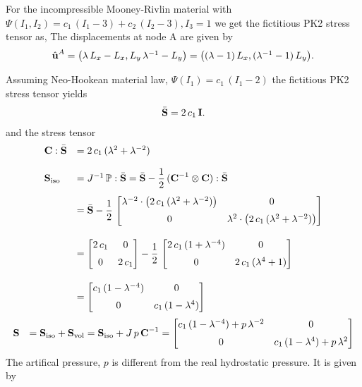 For the incompressible Mooney-Rivlin material with $\Psi(I_1,I_2) = c_1\,(I_1-3) + c_2\,(I_2 - 3), I_3 = 1$ we get the fictitious PK2 stress tensor as,
The displacements at node A are given by
\begin{equation*}
  \begin{array}{lll}
    \hat{\textbf{u}}^A = \big(\lambda\,L_x - L_x, L_y\,\lambda^{-1} - L_y\big) = \big((\lambda-1)\,L_x,(\lambda^{-1}-1)\,L_y\big).
  \end{array}
\end{equation*}

Assuming Neo-Hookean material law, $\Psi(I_1) = c_1\,(I_1 - 2)$ the fictitious PK2 stress tensor yields
\begin{equation*}
  \begin{array}{lll}
    \bar{\textbf{S}} = 2\,c_1\,\textbf{I}.
  \end{array}
\end{equation*}
and the stress tensor
\begin{equation*}
  \begin{array}{lll}
    \textbf{C} : \bar{\textbf{S}} &= 2\,c_1\,(\lambda^2 + \lambda^{-2}) \\[4mm]
    \textbf{S}_\text{iso} &= J^{-1}\,\mathbb{P} : \bar{\textbf{S}} = \bar{\textbf{S}} - \displaystyle\frac{\displaystyle{1}}{\displaystyle{2}}\, (\textbf{C}^{-1} \otimes \textbf{C}):\bar{\textbf{S}} \\[4mm]
     &= \bar{\textbf{S}} - \displaystyle\frac{\displaystyle{1}}{\displaystyle{2}}\, \left[\begin{matrix}
    \lambda^{-2} \cdot \big(2\,c_1\,(\lambda^2 + \lambda^{-2})\big) & 0 \\[2mm]
    0 & \lambda^{2} \cdot \big(2\,c_1\,(\lambda^2 + \lambda^{-2})\big)\end{matrix}\right] \\[8mm]
    &= \left[\begin{matrix}2\,c_1 & 0 \\[2mm] 0 & 2\,c_1\end{matrix}\right] - \displaystyle\frac{\displaystyle{1}}{\displaystyle{2}}\, \left[\begin{matrix}
    2\,c_1\,(1 + \lambda^{-4}) & 0 \\[2mm]
    0 & 2\,c_1\,(\lambda^4 + 1)\end{matrix}\right] \\[8mm]
    &= \left[\begin{matrix}
    c_1\,(1-\lambda^{-4}) & 0 \\[2mm]
    0 & c_1\,(1-\lambda^4)\end{matrix}\right]
  \end{array}
\end{equation*}
\begin{equation*}
  \begin{array}{lll}
    \textbf{S} &= \textbf{S}_\text{iso} + \textbf{S}_\text{vol} = \textbf{S}_\text{iso} + J\,p\,\textbf{C}^{-1} = \left[\begin{matrix}
    c_1\,(1-\lambda^{-4}) + p\,\lambda^{-2} & 0 \\[2mm]
    0 & c_1\,(1-\lambda^4) + p\,\lambda^{2}\end{matrix}\right]
  \end{array}
\end{equation*}
The artifical pressure, $p$ is different from the real hydrostatic pressure. It is given by

